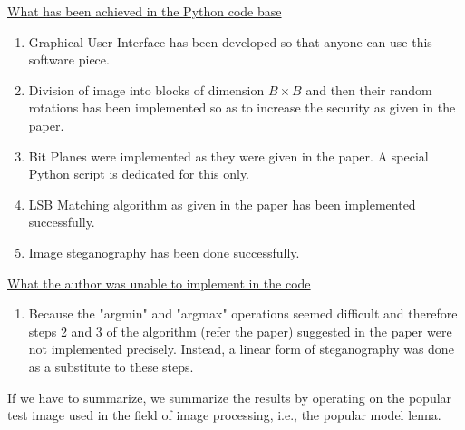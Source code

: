 \documentclass{report}
\begin{document}
\underline{\large What has been achieved in the Python code base}
\begin{enumerate}
\item Graphical User Interface has been developed so that anyone can use this software piece.
\item Division of image into blocks of dimension $B \times B$ and then their random rotations has been implemented so as to increase the security as given in the paper.
\item Bit Planes were implemented as they were given in the paper. A special Python script is dedicated for this only.
\item LSB Matching algorithm as given in the paper has been implemented successfully.
\item Image steganography has been done successfully.
\end{enumerate}
\par
\underline{\large What the author was unable to implement in the code}
\begin{enumerate}
\item Because the "argmin" and "argmax" operations seemed difficult and therefore steps 2 and 3 of the algorithm (refer the paper) suggested in the paper were not implemented precisely. Instead, a linear form of steganography was done as a substitute to these steps.
\end{enumerate}
If we have to summarize, we summarize the results by operating on the popular test image used in the field of image processing, i.e., the popular model lenna.
\end{document}
